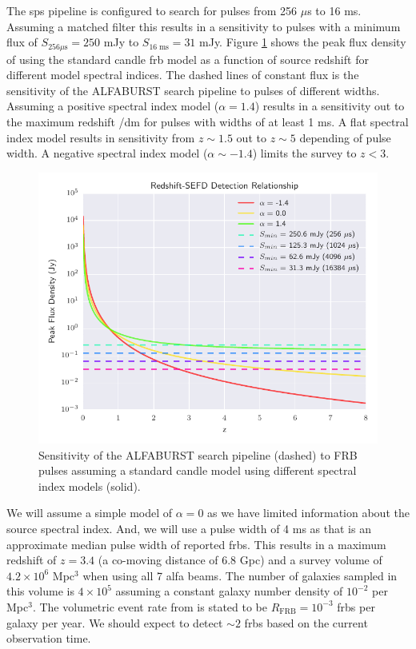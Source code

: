 \documentclass[a4paper,fleqn,usenatbib]{mnras}
\begin{document}
The \gls{sps} pipeline is configured to search for pulses from 256 $\mu$s to 16
ms. Assuming a matched filter this results in a sensitivity to pulses with a
minimum flux of $S_{256 \mu\textrm{s}} = 250$ mJy to $S_{16 \; \textrm{ms}} =
31$ mJy. Figure \ref{fig:fwhm_sefd_z} shows the peak flux density of using the
standard candle \gls{frb} model as a function of source redshift for different
model spectral indices. The dashed lines of constant flux is the sensitivity of
the ALFABURST search pipeline to pulses of different widths. Assuming a positive
spectral index model ($\alpha=1.4$) results in a sensitivity out to the maximum
redshift /\gls{dm} for pulses with widths of at least 1 ms. A flat spectral
index model results in sensitivity from $z \sim 1.5$ out to $z \sim 5$ depending
of pulse width. A negative spectral index model ($\alpha \sim -1.4$) limits the
survey to $z < 3$.

\begin{figure}
    \includegraphics[width=1.0\linewidth]{figures/fwhm_sefd_z_relation.pdf}
    \caption{Sensitivity of the ALFABURST search pipeline (dashed) to FRB pulses
    assuming a standard candle model using different spectral index models
    (solid).
    }
    \label{fig:fwhm_sefd_z}
\end{figure}

We will assume a simple model of $\alpha=0$ as we have limited information about
the source spectral index. And, we will use a pulse width of 4 ms as that is an
approximate median pulse width of reported \glspl{frb}. This results in a
maximum redshift of $z=3.4$ (a co-moving distance of 6.8 Gpc) and a survey volume
of $4.2 \times 10^6$ Mpc$^3$ when using all 7 \gls{alfa} beams. The number of
galaxies sampled in this volume is $4 \times 10^5$ assuming a constant galaxy
number density of $10^{-2}$ per Mpc$^3$.  The volumetric event rate from
\cite{2013Sci...341...53T} is stated to be $R_{\textrm{FRB}} = 10^{-3}$
\glspl{frb} per galaxy per year. We should expect to detect $\sim 2$
\glspl{frb} based on the current observation time.
\end{document}
